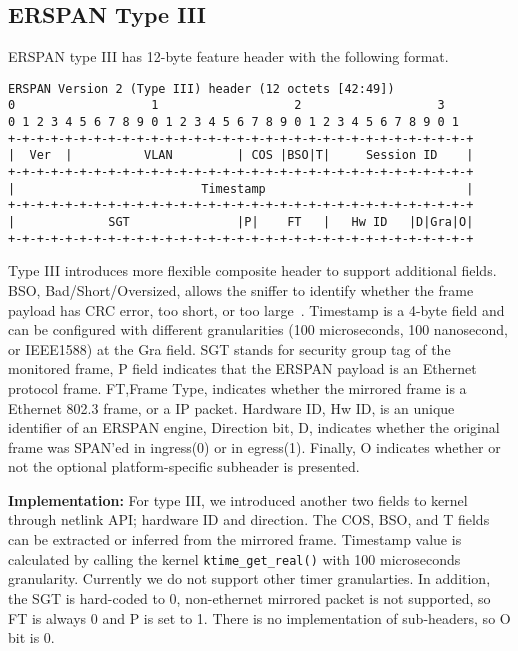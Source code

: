 \documentclass[10pt]{sigplanconf}
\begin{document}
\subsection{ERSPAN Type III}
ERSPAN type III has 12-byte feature header with the following format.
{\scriptsize
\begin{verbatim}
ERSPAN Version 2 (Type III) header (12 octets [42:49])
0                   1                   2                   3
0 1 2 3 4 5 6 7 8 9 0 1 2 3 4 5 6 7 8 9 0 1 2 3 4 5 6 7 8 9 0 1
+-+-+-+-+-+-+-+-+-+-+-+-+-+-+-+-+-+-+-+-+-+-+-+-+-+-+-+-+-+-+-+-+
|  Ver  |          VLAN         | COS |BSO|T|     Session ID    |
+-+-+-+-+-+-+-+-+-+-+-+-+-+-+-+-+-+-+-+-+-+-+-+-+-+-+-+-+-+-+-+-+
|                          Timestamp                            |
+-+-+-+-+-+-+-+-+-+-+-+-+-+-+-+-+-+-+-+-+-+-+-+-+-+-+-+-+-+-+-+-+
|             SGT               |P|    FT   |   Hw ID   |D|Gra|O|
+-+-+-+-+-+-+-+-+-+-+-+-+-+-+-+-+-+-+-+-+-+-+-+-+-+-+-+-+-+-+-+-+
\end{verbatim}
}
Type III introduces more flexible composite header to support additional
fields.  BSO, Bad/Short/Oversized, allows the sniffer to identify whether
the frame payload has CRC error, too short, or too large~\cite{bso}.
Timestamp is a 4-byte field and can be configured with different granularities
(100 microseconds, 100 nanosecond, or IEEE1588) at the Gra field.
SGT stands for security group tag of the monitored frame, P field
indicates that the ERSPAN payload is an Ethernet protocol frame.
FT,Frame Type, indicates whether the mirrored frame is a Ethernet
802.3 frame, or a IP packet.
Hardware ID, Hw ID, is an unique identifier of an ERSPAN engine,
Direction bit, D, indicates whether the original frame was
SPAN'ed in ingress(0) or in egress(1).
Finally, O indicates whether or not the optional platform-specific
subheader is presented.

\textbf{Implementation: }
For type III, we introduced another two fields to kernel through
netlink API; hardware ID and direction.
The COS, BSO, and T fields can be extracted or inferred from the mirrored
frame. Timestamp value is calculated by calling the kernel
\texttt{ktime\_get\_real()} with 100 microseconds granularity.
Currently we do not support other timer granularties.
In addition, the SGT is hard-coded to 0, non-ethernet mirrored packet
is not supported, so FT is always 0 and P is set to 1.
There is no implementation of sub-headers, so O bit is 0.
\end{document}
